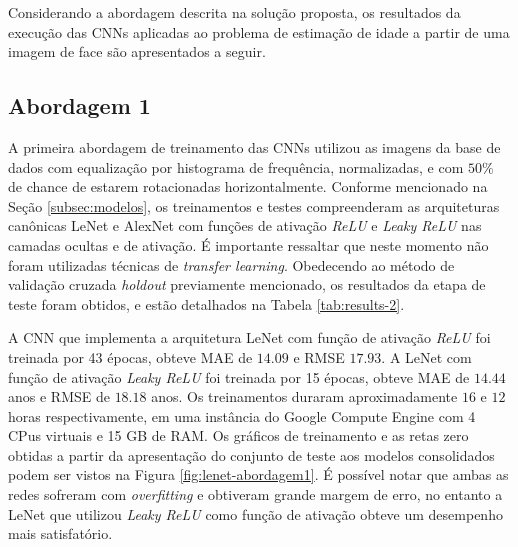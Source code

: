 
Considerando a abordagem descrita na solução proposta, os resultados da execução das CNNs aplicadas ao problema de estimação de idade a partir de uma imagem de face são apresentados a seguir.

%

\subsection{Abordagem 1}%
A primeira abordagem de treinamento das CNNs utilizou as imagens da base de dados com equalização por histograma de frequência, normalizadas, e com $50\%$ de chance de estarem rotacionadas horizontalmente. Conforme mencionado na Seção \ref{subsec:modelos}, os treinamentos e testes compreenderam as arquiteturas canônicas LeNet e AlexNet com funções de ativação \emph{ReLU} e \emph{Leaky ReLU} nas camadas ocultas e de ativação. É importante ressaltar que neste momento não foram utilizadas técnicas de \emph{transfer learning}. Obedecendo ao método de validação cruzada \emph{holdout} previamente mencionado, os resultados da etapa de teste foram obtidos, e estão detalhados na Tabela \ref{tab:results-2}.

A CNN que implementa a arquitetura LeNet com função de ativação \emph{ReLU} foi treinada por 43 épocas, obteve MAE de $14.09$ e RMSE $17.93$. A LeNet com função de ativação \emph{Leaky ReLU} foi treinada por 15 épocas, obteve MAE de $14.44$ anos e RMSE de $18.18$ anos. Os treinamentos duraram aproximadamente $16$ e $12$ horas respectivamente, em uma instância do Google Compute Engine com 4 CPus virtuais e 15 GB de RAM. Os gráficos de treinamento e as retas zero obtidas a partir da apresentação do conjunto de teste aos modelos consolidados podem ser vistos na Figura \ref{fig:lenet-abordagem1}. É possível notar que ambas as redes sofreram com \emph{overfitting} e obtiveram grande margem de erro, no entanto a LeNet que utilizou \emph{Leaky ReLU} como função de ativação obteve um desempenho mais satisfatório.

